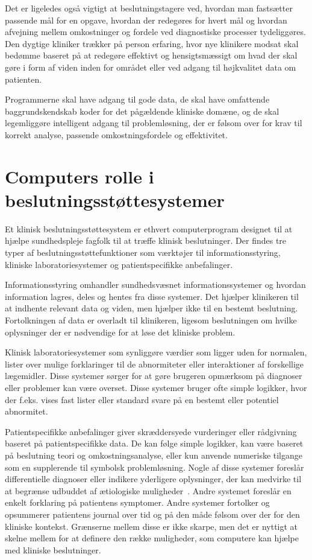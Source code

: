 Det er ligeledes også vigtigt at beslutningstagere ved, hvordan man fastsætter passende mål for en opgave, hvordan der redegøres for hvert mål og hvordan afvejning mellem omkostninger og fordele ved diagnostiske processer tydeliggøres. Den dygtige kliniker trækker på person erfaring, hvor nye klinikere modsat skal bedømme baseret på at redegøre effektivt og hensigtsmæssigt om hvad der skal gøre i form af viden inden for området eller ved adgang til højkvalitet data om patienten. 

Programmerne skal have adgang til gode data, de skal have omfattende baggrundskendskab koder for det pågældende kliniske domæne, og de skal legemliggøre intelligent adgang til problemløsning, der er følsom over for krav til korrekt analyse, passende omkostningsfordele og effektivitet. 

\section{Computers rolle i beslutningsstøttesystemer}
Et klinisk beslutningsstøttesystem er ethvert computerprogram designet til at hjælpe sundhedspleje fagfolk til at træffe klinisk beslutninger. Der findes tre typer af beslutningsstøttefunktioner som værktøjer til informationsstyring, kliniske laboratoriesystemer og patientspecifikke anbefalinger. 

Informationsstyring omhandler sundhedsvæsnet informationssystemer og hvordan information lagres, deles og hentes fra disse systemer. Det hjælper klinikeren til at indhente relevant data og viden, men hjælper ikke til en bestemt beslutning. Fortolkningen af data er overladt til klinikeren, ligesom beslutningen om hvilke oplysninger der er nødvendige for at løse det kliniske problem.

Klinisk laboratoriesystemer som synliggøre værdier som ligger uden for normalen, lister over mulige forklaringer til de abnormiteter eller interaktioner af forskellige lægemidler. Disse systemer sørger for at gøre brugeren opmærksom på diagnoser eller problemer kan være overset. Disse systemer bruger ofte simple logikker, hvor der f.eks. vises fast lister eller standard svare på en bestemt eller potentiel abnormitet. 

Patientspecifikke anbefalinger giver skræddersyede vurderinger eller rådgivning baseret på patientspecifikke data. De kan følge simple logikker, kan være baseret på beslutning teori og omkostningsanalyse, eller kun anvende numeriske tilgange som en supplerende til symbolsk problemløsning. Nogle af disse systemer foreslår differentielle diagnoser eller indikere yderligere oplysninger, der kan medvirke til at begrænse udbuddet af ætiologiske muligheder~. Andre systemet foreslår en enkelt forklaring på patientens symptomer. Andre systemer fortolker og opsummerer patientens journal over tid og på den måde følsom over der for den kliniske kontekst. Grænserne mellem disse er ikke skarpe, men det er nyttigt at skelne mellem for at definere den række muligheder, som computere kan hjælpe  med kliniske beslutninger. 

